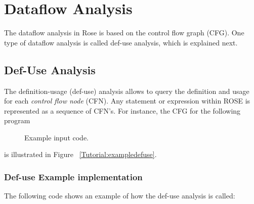 \chapter{Dataflow Analysis}

The dataflow analysis in Rose is based on the control flow graph (CFG).
One type of dataflow analysis is called def-use analysis, which is explained next.

\section{Def-Use Analysis}

The definition-usage (def-use) analysis allows to query the definition
and usage for each \emph{control flow node} (CFN).
Any statement or expression within ROSE is represented as a sequence of CFN's.
For instance, the CFG for the following program



\begin{figure}[!h]
{\indent
{\mySmallFontSize


\begin{latexonly}
   
\end{latexonly}

\begin{htmlonly}
   
\end{htmlonly}

}
}
\caption{Example input code.}
\label{Tutorial:exampledefuseCode}
\end{figure}

is illustrated in Figure ~\ref{Tutorial:exampledefuse}.

\subsection{Def-use Example implementation}

The following code shows an example of how the def-use analysis is called:

{\indent
{\mySmallFontSize


\begin{latexonly}
   
\end{latexonly}

\begin{htmlonly}
   
\end{htmlonly}

}
}


